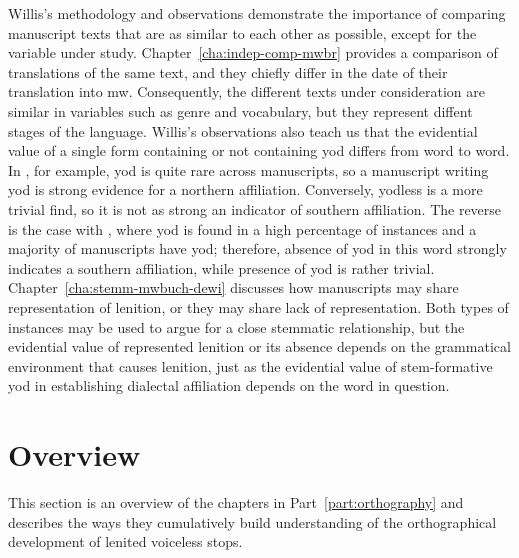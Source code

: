 Willis's methodology and observations demonstrate the importance of comparing  manuscript texts that are as similar to each other as possible, except for the variable under study. Chapter~\ref{cha:indep-comp-mwbr} provides a comparison of translations of the same text, and they chiefly differ in the date of their translation into \gls{mw}. Consequently, the different texts under consideration are similar in variables such as genre and vocabulary, but they represent diffent stages of the language. Willis's observations also teach us that the evidential value of a single form containing or not containing yod  differs from word to word. In , for example, yod is quite rare across manuscripts, so a manuscript writing yod is strong evidence for a northern affiliation. Conversely, yodless  is a more trivial find, so it is not as strong an indicator of southern affiliation. The reverse is the case with , where yod is found in a high percentage of instances and a majority of manuscripts have yod; therefore, absence of yod in this word strongly indicates a southern affiliation, while presence of yod is rather trivial. Chapter~\ref{cha:stemm-mwbuch-dewi} discusses how manuscripts may share representation of lenition, or they may share lack of representation. Both types of  instances may be used to argue for a close stemmatic relationship, but the evidential value of represented lenition or its absence depends on the grammatical environment that causes lenition, just as the evidential value of stem-formative yod in establishing dialectal affiliation depends on the word in question.

\section{Overview}
\label{sec:overview}

This section is an overview of the chapters in Part~\ref{part:orthography} and describes the ways they  cumulatively build understanding of the orthographical development of lenited voiceless stops.

